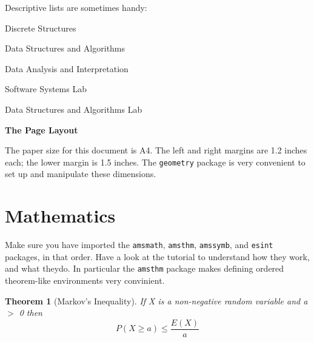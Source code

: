 \documentclass[10pt, Computer Modern]{article}
\newtheorem{theorem}{Theorem}
\theoremstyle{remark}
\begin{document}
Descriptive lists are sometimes handy:


\begin{description}[itemsep=-5pt]
	\item [CS 207] Discrete Structures
	\item [CS 213] Data Structures and Algorithms
	\item [CS 215] Data Analysis and Interpretation
	\item [CS 251] Software Systems Lab
	\item [CS 293] Data Structures and Algorithms Lab
\end{description}	






\large{\textbf{The Page Layout}}
\normalsize

The paper size for this document is A4. The left and right margins are 1.2 inches each; the lower margin is 1.5 inches. The \verb!geometry! package is very convenient to set up and manipulate these dimensions.


\clearpage
\section{Mathematics}
\label{maths}
\renewcommand{\baselinestretch}{-1}
Make sure you have imported the \verb!amsmath!, \verb!amsthm!, \verb!amssymb!, and \verb!esint! packages, in that order. Have a look at the tutorial to understand how they work, and what theydo. In particular the \verb!amsthm! package makes defining ordered theorem-like environments very convinient.



\begin{theorem}[Markov's Inequality]
\label{markov's}
If X is a non-negative random variable and a $ > $ 0 then
\begin{equation*}
P( X \geq a) \leq \frac{E( X )}{a}
\end{equation*}

\end{theorem}
\end{document}
